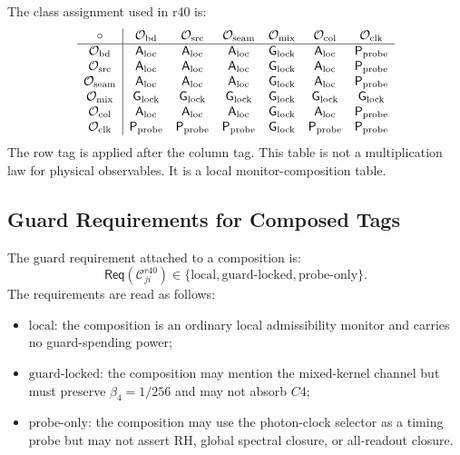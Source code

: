 The class assignment used in r40 is:
\[
\begin{array}{c|cccccc}
\circ & \mathcal O_{\rm bd} & \mathcal O_{\rm src} & \mathcal O_{\rm seam} & \mathcal O_{\rm mix} & \mathcal O_{\rm col} & \mathcal O_{\rm clk}\\
\hline
\mathcal O_{\rm bd}   & \mathsf A_{\rm loc} & \mathsf A_{\rm loc} & \mathsf A_{\rm loc} & \mathsf G_{\rm lock} & \mathsf A_{\rm loc} & \mathsf P_{\rm probe}\\
\mathcal O_{\rm src}  & \mathsf A_{\rm loc} & \mathsf A_{\rm loc} & \mathsf A_{\rm loc} & \mathsf G_{\rm lock} & \mathsf A_{\rm loc} & \mathsf P_{\rm probe}\\
\mathcal O_{\rm seam} & \mathsf A_{\rm loc} & \mathsf A_{\rm loc} & \mathsf A_{\rm loc} & \mathsf G_{\rm lock} & \mathsf A_{\rm loc} & \mathsf P_{\rm probe}\\
\mathcal O_{\rm mix}  & \mathsf G_{\rm lock} & \mathsf G_{\rm lock} & \mathsf G_{\rm lock} & \mathsf G_{\rm lock} & \mathsf G_{\rm lock} & \mathsf G_{\rm lock}\\
\mathcal O_{\rm col}  & \mathsf A_{\rm loc} & \mathsf A_{\rm loc} & \mathsf A_{\rm loc} & \mathsf G_{\rm lock} & \mathsf A_{\rm loc} & \mathsf P_{\rm probe}\\
\mathcal O_{\rm clk}  & \mathsf P_{\rm probe} & \mathsf P_{\rm probe} & \mathsf P_{\rm probe} & \mathsf G_{\rm lock} & \mathsf P_{\rm probe} & \mathsf P_{\rm probe}
\end{array}
\]
The row tag is applied after the column tag.  This table is not a multiplication
law for physical observables.  It is a local monitor-composition table.

\subsection{Guard Requirements for Composed Tags}
\label{subsec:r40-guard-requirements-composed-tags}

The guard requirement attached to a composition is:
\[
\boxed{
\mathsf{Req}(\mathcal C_{ji}^{r40})
\in
\{\mathrm{local},\mathrm{guard\mbox{-}locked},\mathrm{probe\mbox{-}only}\}.
}
\]
The requirements are read as follows:
\begin{itemize}
    \item \(\mathrm{local}\): the composition is an ordinary local admissibility
    monitor and carries no guard-spending power;
    \item \(\mathrm{guard\mbox{-}locked}\): the composition may mention the
    mixed-kernel channel but must preserve \(\beta_4=1/256\) and may not absorb
    \(C4\);
    \item \(\mathrm{probe\mbox{-}only}\): the composition may use the photon-clock
    selector as a timing probe but may not assert RH, global spectral closure, or
    all-readout closure.
\end{itemize}

